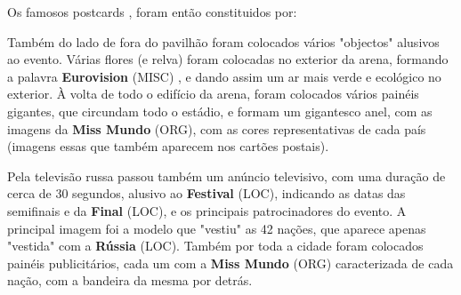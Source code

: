 \documentclass[12pt,a4paper]{article}
\begin{document}
Os famosos postcards , foram então constituidos por:

Também do lado de fora do pavilhão foram colocados vários "objectos" alusivos ao evento. Várias flores (e relva) foram colocadas no exterior da arena, formando a palavra \textbf{Eurovision} (MISC) , e dando assim um ar mais verde e ecológico no exterior. À volta de todo o edifício da arena, foram colocados vários painéis gigantes, que circundam todo o estádio, e formam um gigantesco anel, com as imagens da \textbf{Miss Mundo} (ORG), com as cores representativas de cada país (imagens essas que também aparecem nos cartões postais).

Pela televisão russa passou também um anúncio televisivo, com uma duração de cerca de 30 segundos, alusivo ao \textbf{Festival} (LOC), indicando as datas das semifinais e da \textbf{Final} (LOC), e os principais patrocinadores do evento. A principal imagem foi a modelo que "vestiu" as 42 nações, que aparece apenas "vestida" com a \textbf{Rússia} (LOC). Também por toda a cidade foram colocados painéis publicitários, cada um com a \textbf{Miss Mundo} (ORG) caracterizada de cada nação, com a bandeira da mesma por detrás.
\end{document}
